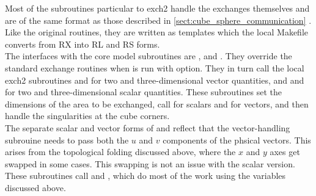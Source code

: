 Most of the subroutines particular to exch2 handle the exchanges
themselves and are of the same format as those described in
\ref{sect:cube_sphere_communication} .  Like the original routines, they are written as
templates which the local Makefile converts from RX into RL and RS
forms. \\

The interfaces with the core model subroutines are
,  and
.  They override the standard exchange routines
when  is run with  option.  They in turn
call the local exch2 subroutines  and
 for two and three-dimensional vector
quantities, and  and  for two
and three-dimensional scalar quantities.  These subroutines set the
dimensions of the area to be exchanged, call 
for scalars and  for vectors, and then handle
the singularities at the cube corners. \\

The separate scalar and vector forms of  and
 reflect that the vector-handling subrouine
needs to pass both the $u$ and $v$ components of the phsical vectors.
This arises from the topological folding discussed above, where the
$x$ and $y$ axes get swapped in some cases.  This swapping is not an
issue with the scalar version. These subroutines call
 and , which do most of
the work using the variables discussed above. \\

